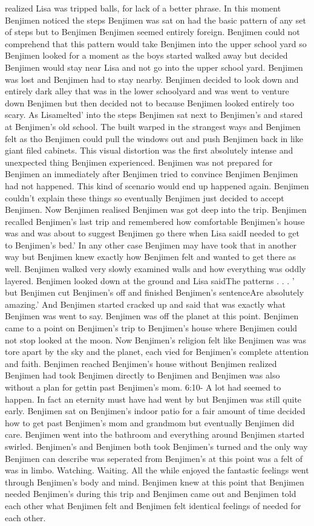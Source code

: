 \documentclass[12pt]{book}
\begin{document}
realized Lisa was tripped balls, for lack of a better phrase. In this moment Benjimen noticed the steps Benjimen was sat on had the basic pattern of any set of steps but to Benjimen Benjimen seemed entirely foreign. Benjimen could not comprehend that this pattern would take Benjimen into the upper school yard so Benjimen looked for a moment as the boys started walked away but decided Benjimen would stay near Lisa and not go into the upper school yard. Benjimen was lost and Benjimen had to stay nearby. Benjimen decided to look down and entirely dark alley that was in the lower schoolyard and was went to venture down Benjimen but then decided not to because Benjimen looked entirely too scary. As Lisamelted' into the steps Benjimen sat next to Benjimen's and stared at Benjimen's old school. The built warped in the strangest ways and Benjimen felt as tho Benjimen could pull the windows out and push Benjimen back in like giant filed cabinets. This visual distortion was the first absolutely intense and unexpected thing Benjimen experienced. Benjimen was not prepared for Benjimen an immediately after Benjimen tried to convince Benjimen Benjimen had not happened. This kind of scenario would end up happened again. Benjimen couldn't explain these things so eventually Benjimen just decided to accept Benjimen. Now Benjimen realised Benjimen was got deep into the trip. Benjimen recalled Benjimen's last trip and remembered how comfortable Benjimen's house was and was about to suggest Benjimen go there when Lisa saidI needed to get to Benjimen's bed.' In any other case Benjimen may have took that in another way but Benjimen knew exactly how Benjimen felt and wanted to get there as well. Benjimen walked very slowly examined walls and how everything was oddly layered. Benjimen looked down at the ground and Lisa saidThe patterns . . .  ' but Benjimen cut Benjimen's off and finished Benjimen's sentenceAre absolutely amazing.' And Benjimen started cracked up and said that was exactly what Benjimen was went to say. Benjimen was off the planet at this point. Benjimen came to a point on Benjimen's trip to Benjimen's house where Benjimen could not stop looked at the moon. Now Benjimen's religion felt like Benjimen was was tore apart by the sky and the planet, each vied for Benjimen's complete attention and faith. Benjimen reached Benjimen's house without Benjimen realized Benjimen had took Benjimen directly to Benjimen and Benjimen was also without a plan for gettin past Benjimen's mom. 6:10- A lot had seemed to happen. In fact an eternity must have had went by but Benjimen was still quite early. Benjimen sat on Benjimen's indoor patio for a fair amount of time decided how to get past Benjimen's mom and grandmom but eventually Benjimen did care. Benjimen went into the bathroom and everything around Benjimen started swirled. Benjimen's and Benjimen both took Benjimen's turned and the only way Benjimen can describe was seperated from Benjimen's at this point was a felt of was in limbo. Watching. Waiting. All the while enjoyed the fantastic feelings went through Benjimen's body and mind. Benjimen knew at this point that Benjimen needed Benjimen's during this trip and Benjimen came out and Benjimen told each other what Benjimen felt and Benjimen felt identical feelings of needed for each other. 
\end{document}

